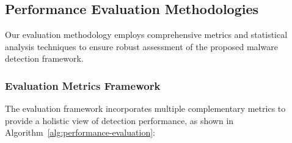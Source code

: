 \subsection{Performance Evaluation Methodologies}
\label{subsec:performance-evaluation}

Our evaluation methodology employs comprehensive metrics and statistical analysis techniques to ensure robust assessment of the proposed malware detection framework.

\subsubsection{Evaluation Metrics Framework}

The evaluation framework incorporates multiple complementary metrics to provide a holistic view of detection performance, as shown in Algorithm~\ref{alg:performance-evaluation}:

